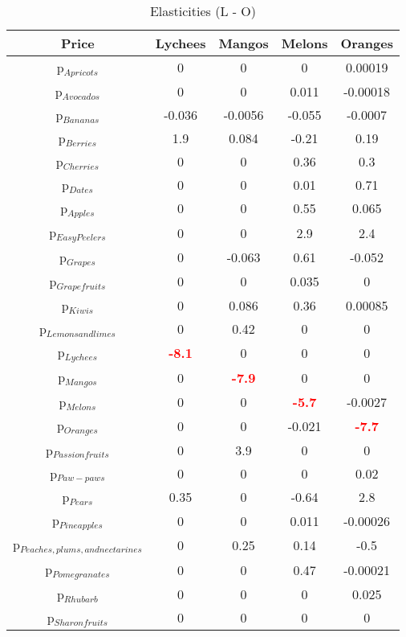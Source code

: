 \documentclass[11pt]{article}
\begin{document}
\begin{table}[h]
\caption{Elasticities (L - O)}
\label{Table: elasticities 4}
\begin{center}
\begin{tabular}{ccccc}
Price & Lychees & Mangos & Melons & Oranges \\ \hline
p$_{Apricots}$ & 0 & 0 & 0 & 0.00019 \\ 
p$_{Avocados}$ & 0 & 0 & 0.011 & -0.00018 \\ 
p$_{Bananas}$ & -0.036 & -0.0056 & -0.055 & -0.0007 \\ 
p$_{Berries}$ & 1.9 & 0.084 & -0.21 & 0.19 \\ 
p$_{Cherries}$ & 0 & 0 & 0.36 & 0.3 \\ 
p$_{Dates}$ & 0 & 0 & 0.01 & 0.71 \\ 
p$_{Apples}$ & 0 & 0 & 0.55 & 0.065 \\ 
p$_{Easy Peelers}$ & 0 & 0 & 2.9 & 2.4 \\ 
p$_{Grapes}$ & 0 & -0.063 & 0.61 & -0.052 \\ 
p$_{Grapefruits}$ & 0 & 0 & 0.035 & 0 \\ 
p$_{Kiwis}$ & 0 & 0.086 & 0.36 & 0.00085 \\ 
p$_{Lemons and limes}$ & 0 & 0.42 & 0 & 0 \\ 
p$_{Lychees}$ & \textcolor{red}{\textbf{-8.1}} & 0 & 0 & 0 \\ 
p$_{Mangos}$ & 0 & \textcolor{red}{\textbf{-7.9}} & 0 & 0 \\ 
p$_{Melons}$ & 0 & 0 & \textcolor{red}{\textbf{-5.7}} & -0.0027 \\ 
p$_{Oranges}$ & 0 & 0 & -0.021 & \textcolor{red}{\textbf{-7.7}} \\ 
p$_{Passion fruits}$ & 0 & 3.9 & 0 & 0 \\ 
p$_{Paw-paws}$ & 0 & 0 & 0 & 0.02 \\ 
p$_{Pears}$ & 0.35 & 0 & -0.64 & 2.8 \\ 
p$_{Pineapples}$ & 0 & 0 & 0.011 & -0.00026 \\ 
p$_{Peaches, plums, and nectarines}$ & 0 & 0.25 & 0.14 & -0.5 \\ 
p$_{Pomegranates}$ & 0 & 0 & 0.47 & -0.00021 \\ 
p$_{Rhubarb}$ & 0 & 0 & 0 & 0.025 \\ 
p$_{Sharon fruits}$ & 0 & 0 & 0 & 0 \\ 
\end{tabular}
\end{center}
\end{table}
\end{document}

